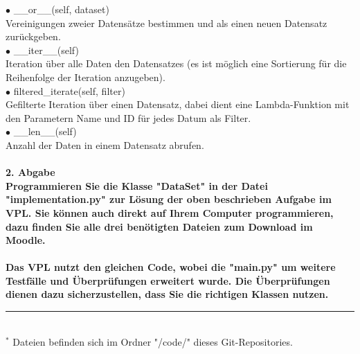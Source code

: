\documentclass[]{scrartcl}
\begin{document}
$\bullet$ \_\_or\_\_(self, dataset)\\
\hspace*{1cm} Vereinigungen zweier Datensätze bestimmen und als einen neuen Datensatz zurückgeben.\\
$\bullet$ \_\_iter\_\_(self)\\
\hspace*{1cm} Iteration über alle Daten den Datensatzes (es ist möglich eine Sortierung für die Reihenfolge der Iteration anzugeben).\\ 
$\bullet$ filtered\_iterate(self, filter)\\
\hspace*{1cm} Gefilterte Iteration über einen Datensatz, dabei dient eine Lambda-Funktion mit den Parametern Name und ID für jedes Datum als Filter.\\
$\bullet$ \_\_len\_\_(self)\\
\hspace*{1cm} Anzahl der Daten in einem Datensatz abrufen.\\
\\
\bf \large 2. Abgabe \normalsize \normalfont\\[0.5cm]
Programmieren Sie die Klasse "DataSet" in der Datei "implementation.py" zur Lösung der oben beschrieben Aufgabe im VPL.
Sie können auch direkt auf Ihrem Computer programmieren, dazu finden Sie alle drei benötigten Dateien zum Download im Moodle.\\
\\
Das VPL nutzt den gleichen Code, wobei die "main.py" um weitere Testfälle und Überprüfungen erweitert wurde.
Die Überprüfungen dienen dazu sicherzustellen, dass Sie die richtigen Klassen nutzen.\\
%
\hrule\hfill\\[0.2cm]
$^*$ Dateien befinden sich im Ordner "/code/" dieses Git-Repositories.\\
\end{document}
